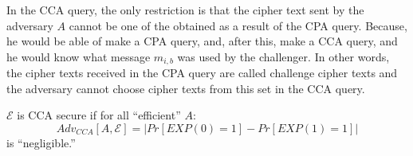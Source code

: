 \documentclass[12pt]{book}
\begin{document}
\begin{center}
\end{center}In the CCA query, the only restriction is that the cipher text sent by the adversary $A$ cannot be one of the obtained as a result of the CPA query. Because, he would be able of make a CPA query, and, after this, make a CCA query, and he would know what message $m_{i,b}$ was used by the challenger. In other words, the cipher texts received in the CPA query are called challenge cipher texts and the adversary cannot choose cipher texts from this set in the CCA query.

$\mathcal{E}$ is CCA secure if for all ``efficient'' $A$:
$$Adv_{CCA}[A,\mathcal{E}]=\big|Pr[EXP(0)=1]-Pr[EXP(1)=1]\big|$$is ``negligible.''
\end{document}
